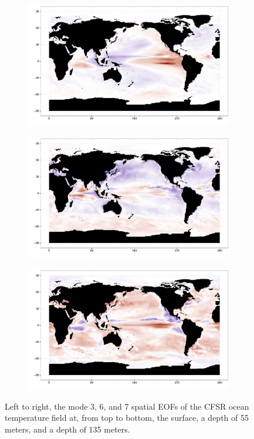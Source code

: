\begin{figure}[h!bt]
\begin{subfigure}{.3\textwidth}
  \end{subfigure}
  \begin{subfigure}{.3\textwidth}
    \centering
    \includegraphics[width=.9\linewidth]{images/EOF3_135.pdf}
  \end{subfigure}
  \begin{subfigure}{.3\textwidth}
    \centering
    \includegraphics[width=.9\linewidth]{images/EOF6_135.pdf}
  \end{subfigure}
  \begin{subfigure}{.3\textwidth}
    \centering
    \includegraphics[width=.9\linewidth]{images/EOF7_135.pdf}
  \end{subfigure}
  \caption{Left to right, the mode 3, 6, and 7 spatial EOFs of the CFSR ocean temperature field at, from top to bottom, the surface, a depth of 55 meters, and a depth of 135 meters. }
\end{figure}

